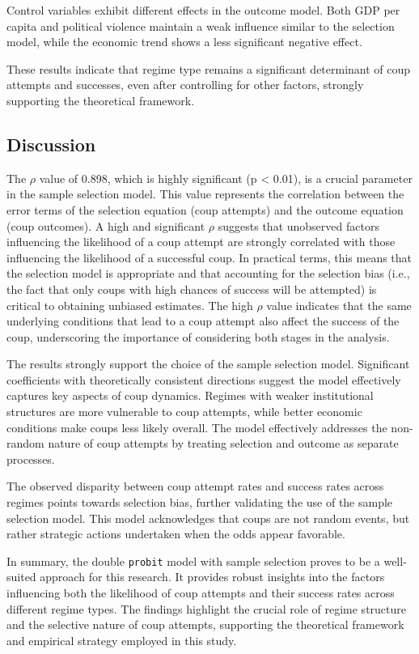 \documentclass[
  12pt,
]{report}
\begin{document}
Control variables exhibit different effects in the outcome model. Both
GDP per capita and political violence maintain a weak influence similar
to the selection model, while the economic trend shows a less
significant negative effect.

These results indicate that regime type remains a significant
determinant of coup attempts and successes, even after controlling for
other factors, strongly supporting the theoretical framework.

\subsection{Discussion}\label{discussion}

The \(\rho\) value of 0.898, which is highly significant (p \textless{}
0.01), is a crucial parameter in the sample selection model. This value
represents the correlation between the error terms of the selection
equation (coup attempts) and the outcome equation (coup outcomes). A
high and significant \(\rho\) suggests that unobserved factors
influencing the likelihood of a coup attempt are strongly correlated
with those influencing the likelihood of a successful coup. In practical
terms, this means that the selection model is appropriate and that
accounting for the selection bias (i.e., the fact that only coups with
high chances of success will be attempted) is critical to obtaining
unbiased estimates. The high \(\rho\) value indicates that the same
underlying conditions that lead to a coup attempt also affect the
success of the coup, underscoring the importance of considering both
stages in the analysis.

The results strongly support the choice of the sample selection model.
Significant coefficients with theoretically consistent directions
suggest the model effectively captures key aspects of coup dynamics.
Regimes with weaker institutional structures are more vulnerable to coup
attempts, while better economic conditions make coups less likely
overall. The model effectively addresses the non-random nature of coup
attempts by treating selection and outcome as separate processes.

The observed disparity between coup attempt rates and success rates
across regimes points towards selection bias, further validating the use
of the sample selection model. This model acknowledges that coups are
not random events, but rather strategic actions undertaken when the odds
appear favorable.

In summary, the double \texttt{probit} model with sample selection
proves to be a well-suited approach for this research. It provides
robust insights into the factors influencing both the likelihood of coup
attempts and their success rates across different regime types. The
findings highlight the crucial role of regime structure and the
selective nature of coup attempts, supporting the theoretical framework
and empirical strategy employed in this study.
\end{document}
